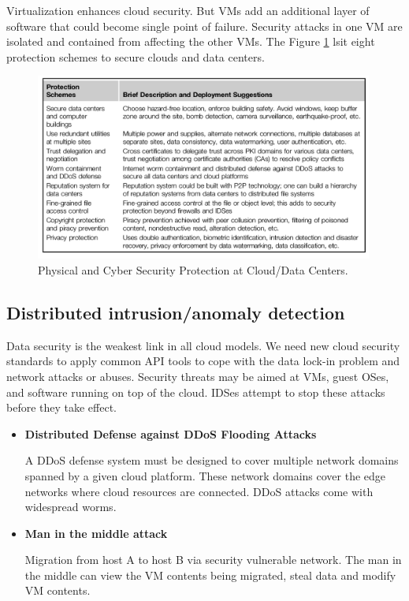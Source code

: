 \documentclass[12pt]{report}
\begin{document}
Virtualization enhances cloud security. But VMs add an additional layer of software that could become single point of failure. Security attacks in one VM are isolated and contained from affecting the other VMs. The Figure \ref{cloudsec} lsit eight protection schemes to secure clouds and data centers.

\begin{figure}[ht]
		\centering
           \includegraphics[width=0.99\textwidth]{cloudsec.png}
         \caption{Physical and Cyber Security Protection at Cloud/Data Centers.}
         \label{cloudsec}
\end{figure} 

\subsection*{Distributed intrusion/anomaly detection}

Data security is the weakest link in all cloud models. We need new cloud security standards to apply common API tools to cope with the data lock-in problem and network attacks or abuses.
Security threats may be aimed at VMs, guest OSes, and software running on top of the cloud. IDSes attempt to stop these attacks before they take effect.

\begin{itemize}
\item \textbf{Distributed Defense against DDoS Flooding Attacks}

		A DDoS defense system must be designed to cover multiple network domains spanned by a given cloud platform. These network domains cover the edge networks where cloud resources are connected. DDoS attacks come with widespread worms.
        
\item \textbf{ Man in the middle attack}

Migration from host A to host B via security vulnerable network. The man in the middle can view the VM contents being migrated, steal data and modify VM contents.		

\end{itemize}
\end{document}
